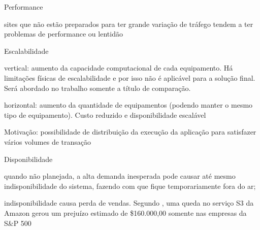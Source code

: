 \begin{alineas}

  \item Performance

  \begin{alineas}
     \item sites que não estão preparados para ter grande variação de tráfego
           tendem a ter problemas de performance ou lentidão
  \end{alineas}

  \item Escalabilidade

  \begin{alineas}
     \item vertical: aumento da capacidade computacional de cada equipamento.
           Há limitações físicas de escalabilidade e por isso não é aplicável
           para a solução final.
           Será abordado no trabalho somente a título de comparação.
     \item horizontal: aumento da quantidade de equipamentos
           (podendo manter o mesmo tipo de equipamento). Custo reduzido e
           disponibilidade escalável
     \item Motivação: possibilidade de distribuição da execução da aplicação para satisfazer
           vários volumes de transação \cite{arquiteturas-em-n-camadas}
  \end{alineas}

  \item Disponibilidade

  \begin{alineas}
     \item quando não planejada, a alta demanda inesperada pode causar até mesmo
           indisponibilidade do sistema, fazendo com que fique temporariamente
           fora do ar;
     \item indisponibilidade causa perda de vendas. Segundo
           \cite{disponibilidade-downtime-perdas}, uma queda no serviço S3 da
           Amazon gerou um prejuízo estimado de \$160.000,00 somente nas empresas
           da S\&P 500
  \end{alineas}

\end{alineas}
